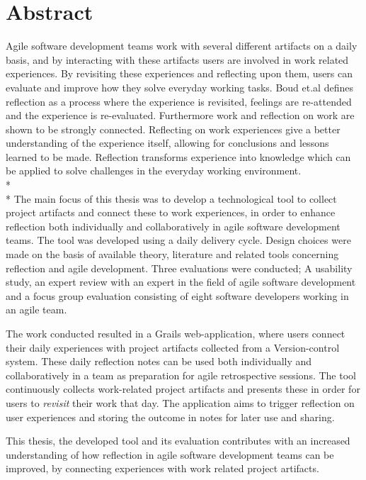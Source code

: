 \section*{Abstract}
Agile software development teams work with several different artifacts on a daily basis, and by interacting with these artifacts users are involved in work related experiences. By revisiting these experiences and reflecting upon them, users can evaluate and improve how they solve everyday working tasks. Boud et.al defines reflection as a process where the experience is revisited, feelings are re-attended and the experience is re-evaluated\citep{boudreflection1985}. 
Furthermore work and reflection on work are shown to be strongly connected\citep{Schon1983}\citep{Chaiklin1993}. Reflecting on work experiences give a better understanding of the experience itself, allowing for conclusions and lessons learned to be made. 
Reflection transforms experience into knowledge which can be applied to solve challenges in the everyday working environment. \\*
\\*
The main focus of this thesis was to develop a technological tool to collect project artifacts and connect these to work experiences, in order to enhance reflection both individually and collaboratively in agile software development teams.
The tool was developed using a daily delivery cycle. Design choices were made on the basis of available theory, literature and related tools concerning reflection and agile development. Three evaluations were conducted; A usability study, an expert review with an expert in the field of agile software development and a focus group evaluation consisting of eight software developers working in an agile team. 

The work conducted resulted in a Grails web-application, where users connect their daily experiences with project artifacts collected from a Version-control system. These daily reflection notes can be used both individually and collaboratively in a team as preparation for agile retrospective sessions. The tool continuously collects work-related project artifacts and presents these in order for users to \emph{revisit} their work that day. The application aims to trigger reflection on user experiences and storing the outcome in notes for later use and sharing.

This thesis, the developed tool and its evaluation contributes with an increased understanding of how reflection in agile software development teams can be improved, by connecting experiences with work related project artifacts. 

\newpage